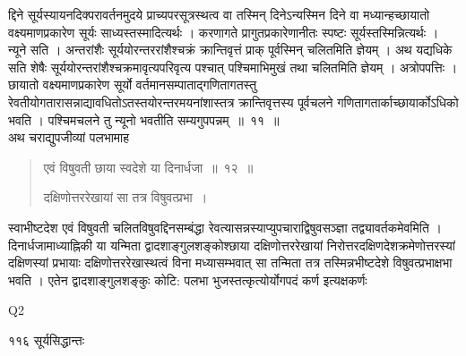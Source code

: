 \documentclass[11pt, openany]{book}
\begin{document}
\begin{sloppypar}
\noindent द्दिने सूर्यस्यायनदिक्परावर्तनमुदये प्राच्यपरसूत्रस्थत्व वा तस्मिन् दिनेऽन्यस्मिन दिने वा मध्यान्हच्छायातो वक्ष्यमाणप्रकारेण सूर्यः साध्यस्तस्मादित्यर्थः । करणागते प्रागुतप्रकारेणानीतः स्पष्टः सूर्यस्तस्मिन्नित्यर्थः । न्यूने सति । अन्तरांशैः सूर्ययोरन्तररांशैश्चक्रं क्रान्तिवृत्तं प्राक् पूर्वस्मिन् चलितमिति ज्ञेयम् । अथ यद्यधिके सति शेषैः सूर्ययोरन्तरांशैश्चक्रमावृत्यपरिवृत्य पश्चात् पश्चिमाभिमुखं तथा चलितमिति ज्ञेयम् । अत्रोपपत्तिः । छायातो वक्ष्यमाणप्रकारेण सूर्यो वर्तमानसम्पाताद्गणितागतस्तु रेवतीयोगतारासन्नाद्यावधितोऽतस्तयोरन्तरमयनांशास्तत्र क्रान्तिवृत्तस्य पूर्वचलने गणितागतार्काच्छायार्कोऽधिको भवति । पश्चिमचलने तु न्यूनो भवतीति सम्यगुपपन्नम्~॥~११~॥\\
\noindent अथ चराद्युपजीव्यां पलभामाह\textendash
\end{sloppypar}
\begin{quote}

 {\ssi एवं विषुवती छाया स्वदेशे या दिनार्धजा~॥~१२~॥
 
दक्षिणोत्तररेखायां सा तत्र विषुवत्प्रभा~।}
\end{quote}
\begin{sloppypar}
 स्वाभीष्टदेश एवं विषुवती चलितविषुवद्दिनसम्बंद्धा रेवत्यासन्नस्याप्युपचाराद्विषुवसञ्ज्ञा तद्व्यावर्तकमेवमिति । दिनार्धजामाध्याह्निकी या यन्मिता द्वादशाङ्गुलशङ्कोश्छाया दक्षिणोत्तररेखायां निरोत्तरदक्षिणदेशक्रमेणोत्तरस्यां दक्षिणस्यां प्रभायाः दक्षिणोत्तररेखास्थत्वं विना मध्यासम्भवात् सा तन्मिता तत्र तस्मिन्नभीष्टदेशे विषुवत्प्रभाक्षभा भवति । एतेन द्वादशाङ्गुलशङ्कुः कोटि: पलभा भुजस्तत्कृत्योर्योगपदं कर्ण इत्यक्षकर्णः
\end{sloppypar}

{\tiny{Q2}}

\newpage

\noindent ११६ \hspace{4cm} सूर्यसिद्धान्तः
\vspace{1cm}
\end{document}

